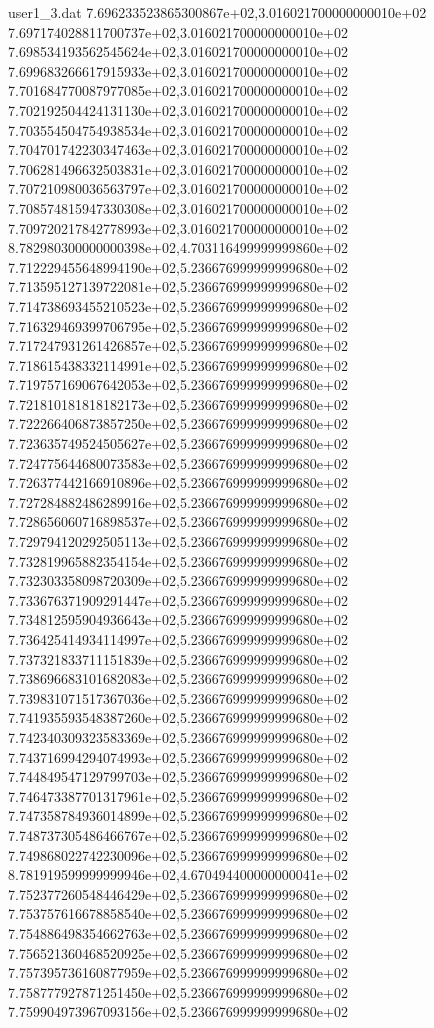 \begin{filecontents}{user1_3.dat}
7.696233523865300867e+02,3.016021700000000010e+02
7.697174028811700737e+02,3.016021700000000010e+02
7.698534193562545624e+02,3.016021700000000010e+02
7.699683266617915933e+02,3.016021700000000010e+02
7.701684770087977085e+02,3.016021700000000010e+02
7.702192504424131130e+02,3.016021700000000010e+02
7.703554504754938534e+02,3.016021700000000010e+02
7.704701742230347463e+02,3.016021700000000010e+02
7.706281496632503831e+02,3.016021700000000010e+02
7.707210980036563797e+02,3.016021700000000010e+02
7.708574815947330308e+02,3.016021700000000010e+02
7.709720217842778993e+02,3.016021700000000010e+02
8.782980300000000398e+02,4.703116499999999860e+02
7.712229455648994190e+02,5.236676999999999680e+02
7.713595127139722081e+02,5.236676999999999680e+02
7.714738693455210523e+02,5.236676999999999680e+02
7.716329469399706795e+02,5.236676999999999680e+02
7.717247931261426857e+02,5.236676999999999680e+02
7.718615438332114991e+02,5.236676999999999680e+02
7.719757169067642053e+02,5.236676999999999680e+02
7.721810181818182173e+02,5.236676999999999680e+02
7.722266406873857250e+02,5.236676999999999680e+02
7.723635749524505627e+02,5.236676999999999680e+02
7.724775644680073583e+02,5.236676999999999680e+02
7.726377442166910896e+02,5.236676999999999680e+02
7.727284882486289916e+02,5.236676999999999680e+02
7.728656060716898537e+02,5.236676999999999680e+02
7.729794120292505113e+02,5.236676999999999680e+02
7.732819965882354154e+02,5.236676999999999680e+02
7.732303358098720309e+02,5.236676999999999680e+02
7.733676371909291447e+02,5.236676999999999680e+02
7.734812595904936643e+02,5.236676999999999680e+02
7.736425414934114997e+02,5.236676999999999680e+02
7.737321833711151839e+02,5.236676999999999680e+02
7.738696683101682083e+02,5.236676999999999680e+02
7.739831071517367036e+02,5.236676999999999680e+02
7.741935593548387260e+02,5.236676999999999680e+02
7.742340309323583369e+02,5.236676999999999680e+02
7.743716994294074993e+02,5.236676999999999680e+02
7.744849547129799703e+02,5.236676999999999680e+02
7.746473387701317961e+02,5.236676999999999680e+02
7.747358784936014899e+02,5.236676999999999680e+02
7.748737305486466767e+02,5.236676999999999680e+02
7.749868022742230096e+02,5.236676999999999680e+02
8.781919599999999946e+02,4.670494400000000041e+02
7.752377260548446429e+02,5.236676999999999680e+02
7.753757616678858540e+02,5.236676999999999680e+02
7.754886498354662763e+02,5.236676999999999680e+02
7.756521360468520925e+02,5.236676999999999680e+02
7.757395736160877959e+02,5.236676999999999680e+02
7.758777927871251450e+02,5.236676999999999680e+02
7.759904973967093156e+02,5.236676999999999680e+02

\end{filecontents}
